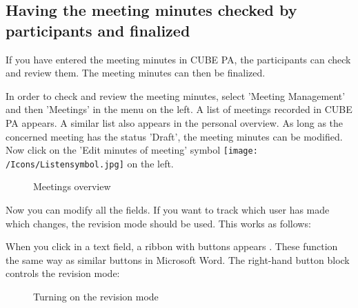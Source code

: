 \subsection{Having the meeting minutes checked by participants and finalized}
\label{bkm:Ref434478117}
If you have entered the meeting minutes in CUBE PA, the participants can check and review them. The meeting minutes can then be finalized.

\vspace{\baselineskip}

In order to check and review the meeting minutes, select 'Meeting Management' and then 'Meetings' in the menu on the left. A list of meetings recorded in CUBE PA appears. A similar list also appears in the personal overview. As long as the concerned meeting has the status 'Draft', the meeting minutes can be modified. Now click on the 'Edit minutes of meeting' symbol \texttt{[image: /Icons/Listensymbol.jpg]}  on the left.

\begin{figure}[H]
\caption{Meetings overview}
\end{figure}

\vspace{\baselineskip}

Now you can modify all the fields. If you want to track which user has made which changes, the revision mode should be used. This works as follows:

\vspace{\baselineskip}

When you click in a text field, a ribbon with buttons appears . These function the same way as similar buttons in Microsoft Word. The right-hand button block controls the revision mode:

\begin{figure}[H]
\caption{Turning on the revision mode}
\end{figure}

